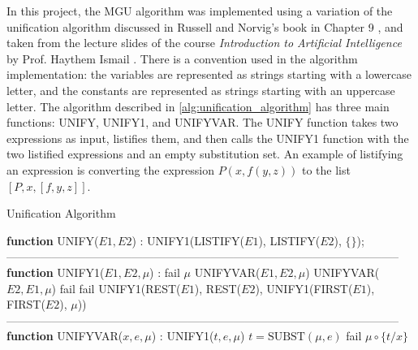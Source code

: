 In this project, the \ac{MGU} algorithm was implemented using a variation of the unification algorithm discussed in Russell and Norvig's book in Chapter 9 \cite{RN2009_Ch.9}, and taken from the lecture slides of the course \textit{Introduction to Artificial Intelligence} by Prof. Haythem Ismail \cite{Ismail2023}.
There is a convention used in the algorithm implementation: the variables are represented as strings starting with a lowercase letter, and the constants are represented as strings starting with an uppercase letter.
The algorithm described in \autoref{alg:unification_algorithm} has three main functions: UNIFY, UNIFY1, and UNIFYVAR. The UNIFY function takes two expressions as input, listifies them, and then calls the UNIFY1 function with the two listified expressions and an empty substitution set. An example of listifying an expression is converting the expression $P(x, f(y,z))$ to the list $[P, x, [f, y, z]]$.
\begin{algorithm}[H]
    \caption{Unification Algorithm}
    \begin{algorithmic}[1]
        \label{alg:unification_algorithm}
        \STATE \textbf{function} UNIFY($E1, E2$) :
        \RETURN UNIFY1(LISTIFY($E1$), LISTIFY($E2$), $\{\}$);
        \STATE
        --------------------------------------------------------------------------------------------------------
        \STATE
        \STATE \textbf{function} UNIFY1($E1, E2, \mu$) :
        \RETURN fail
        \ENDIF
        \RETURN $\mu$
        \ENDIF
        \RETURN UNIFYVAR($E1, E2, \mu$)\ENDIF
        \RETURN UNIFYVAR($E2, E1, \mu$)
        \ENDIF
        \RETURN fail
        \ENDIF
        \RETURN fail
        \ENDIF
        \RETURN UNIFY1(REST($E1$), REST($E2$), UNIFY1(FIRST($E1$), FIRST($E2$), $\mu$))
        \STATE
        --------------------------------------------------------------------------------------------------------
        \STATE
        \STATE \textbf{function} UNIFYVAR($x, e, \mu$) :
        \RETURN UNIFY1($t, e, \mu$)
        \ENDIF
        \STATE $t = \text{SUBST}(\mu, e)$
        \RETURN fail
        \ELSE
        \RETURN $\mu \circ \{t/x\}$
        \ENDIF
    \end{algorithmic}
\end{algorithm}
